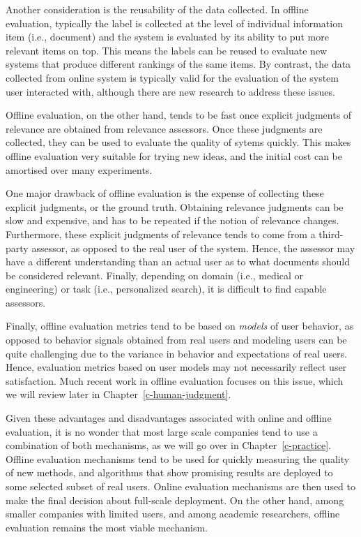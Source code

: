Another consideration is the reusability of the data collected. In offline evaluation, typically the label is collected at the level of individual information item (i.e., document) and the system is evaluated by its ability to put more relevant items on top. This means the labels can be reused to evaluate new systems that produce different rankings of the same items. By contrast, the data collected from online system is typically valid for the evaluation of the system user interacted with, although there are new research to address these issues.

Offline evaluation, on the other hand, tends to be fast once explicit judgments of relevance are obtained from relevance assessors. Once these judgments are collected, they can be used to evaluate the quality of sytems quickly. This makes offline evaluation very suitable for trying new ideas, and the initial cost can be amortised over many experiments. %

One major drawback of offline evaluation is the expense of collecting these explicit judgments, or the ground truth. Obtaining relevance judgments can be slow and expensive, and has to be repeated if the notion of relevance changes. Furthermore, these explicit judgments of relevance tends to come from a third-party assessor, as opposed to the real user of the system. Hence, the assessor may have a different understanding than an actual user as to what documents should be considered relevant. Finally, depending on domain (i.e., medical or engineering) or task (i.e., personalized search), it is difficult to find capable assessors. 

Finally, offline evaluation metrics tend to be based on \emph{models} of user behavior, as opposed to behavior signals obtained from real users and modeling users can be quite challenging due to the variance in behavior and expectations of real users. Hence, evaluation metrics based on user models may not necessarily reflect user satisfaction. Much recent work in offline evaluation focuses on this issue, which we will review later in Chapter~\ref{c-human-judgment}. %

Given these advantages and disadvantages associated with online and offline evaluation, it is no wonder that most large scale companies tend to use a combination of both mechanisms, as we will go over in Chapter~\ref{c-practice}. Offline evaluation mechanisms tend to be used for quickly measuring the quality of new methods, and algorithms that show promising results are deployed to some selected subset of real users. Online evaluation mechanisms are then used to make the final decision about full-scale deployment. On the other hand, among smaller companies with limited users, and among academic researchers, offline evaluation remains the most viable mechanism.

